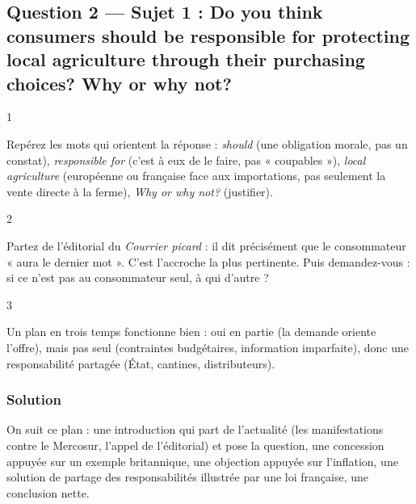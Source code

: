 \documentclass[11pt,a4paper]{article}
\begin{document}
\hypertarget{question-2-sujet-1-do-you-think-consumers-should-be-responsible-for-protecting-local-agriculture-through-their-purchasing-choices-why-or-why-not}{%
\subsection{Question 2 --- Sujet 1 : Do you think consumers should be responsible for protecting local agriculture through their purchasing choices? Why or why not?}\label{question-2-sujet-1-do-you-think-consumers-should-be-responsible-for-protecting-local-agriculture-through-their-purchasing-choices-why-or-why-not}}

\begin{indication}{1}

Repérez les mots qui orientent la réponse : \emph{should} (une obligation morale, pas un constat), \emph{responsible for} (c'est à eux de le faire, pas « coupables »), \emph{local agriculture} (européenne ou française face aux importations, pas seulement la vente directe à la ferme), \emph{Why or why not?} (justifier).

\end{indication}

\begin{indication}{2}

Partez de l'éditorial du \emph{Courrier picard} : il dit précisément que le consommateur « aura le dernier mot ». C'est l'accroche la plus pertinente. Puis demandez-vous : si ce n'est pas au consommateur seul, à qui d'autre ?

\end{indication}

\begin{indication}{3}

Un plan en trois temps fonctionne bien : oui en partie (la demande oriente l'offre), mais pas seul (contraintes budgétaires, information imparfaite), donc une responsabilité partagée (État, cantines, distributeurs).

\end{indication}

\hypertarget{solution-1}{%
\subsubsection{Solution}\label{solution-1}}

On suit ce plan : une introduction qui part de l'actualité (les manifestations contre le Mercosur, l'appel de l'éditorial) et pose la question, une concession appuyée sur un exemple britannique, une objection appuyée sur l'inflation, une solution de partage des responsabilités illustrée par une loi française, une conclusion nette.
\end{document}
